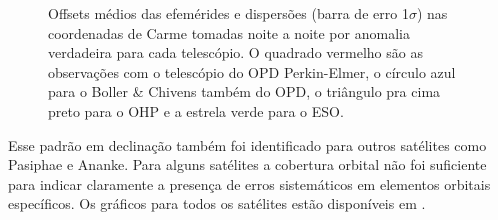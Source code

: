 \documentclass[12pt,a4paper]{monografia}
\begin{document}
\begin{figure}[h]
\begin{centering}
\caption{Offsets médios das efemérides e dispersões (barra de erro 1$\sigma$) nas coordenadas de Carme tomadas noite a noite por anomalia verdadeira para cada telescópio. O quadrado vermelho são as observações com o telescópio do OPD Perkin-Elmer, o círculo azul para o Boller \& Chivens também do OPD, o triângulo pra cima preto para o OHP e a estrela verde para o ESO.
\label{Fig: carme_anom}}
\end{centering}
\end{figure}

Esse padrão em declinação também foi identificado para outros satélites como Pasiphae e Ananke. Para alguns satélites a cobertura orbital não foi suficiente para indicar claramente a presença de erros sistemáticos em elementos orbitais específicos. Os gráficos para todos os satélites estão disponíveis em \cite{GomesJunior2015-Irregular}.
\end{document}

